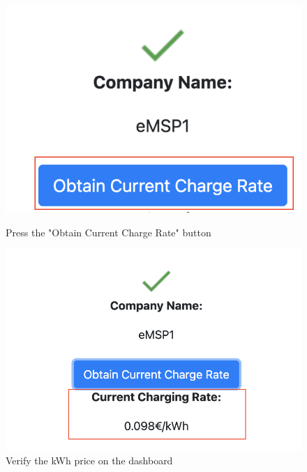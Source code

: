 \begin{figure}[H]
\centering
\begin{minipage}{.5\textwidth}
  \centering
  \includegraphics[width=.9\linewidth]{images/Frontend/Charging/6.png}
  \caption[]{Press the "Obtain Current Charge Rate" button}
  \label{fig:charging_screenshot_6}
\end{minipage}%
\begin{minipage}{.5\textwidth}
  \centering
  \includegraphics[width=.9\linewidth]{images/Frontend/Charging/7.png}
  \caption[]{Verify the kWh price on the dashboard}
  \label{fig:charging_screenshot_7}
\end{minipage}
\end{figure}


